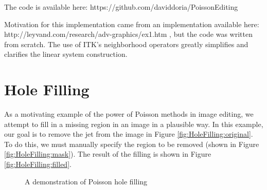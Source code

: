 \documentclass{InsightArticle}
\begin{document}
The code is available here: https://github.com/daviddoria/PoissonEditing

Motivation for this implementation came from an implementation available here: http://leyvand.com/research/adv-graphics/ex1.htm , but the code was written from scratch. The use of ITK's neighborhood operators greatly simplifies and clarifies the linear system construction.

\section{Hole Filling}
As a motivating example of the power of Poisson methods in image editing, we attempt to fill in a missing region in an image in a plausible way. In this example, our goal is to remove the jet from the image in Figure \ref{fig:HoleFilling:original}. To do this, we must manually specify the region to be removed (shown in Figure \ref{fig:HoleFilling:mask}). The result of the filling is shown in Figure \ref{fig:HoleFilling:filled}.

\begin{figure}[H]
\centering
{}
\caption{A demonstration of Poisson hole filling}
\label{fig:HoleFilling}
\end{figure}
\end{document}
